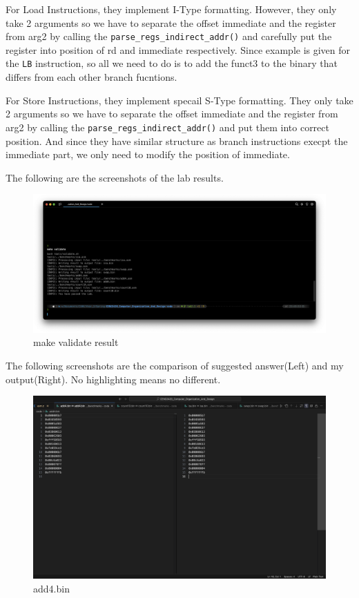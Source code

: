 \documentclass[12pt, a4paper]{article}
\begin{document}
\begin{ans}
For Load Instructions, they implement I-Type formatting. However, they only take 2 arguments so we have to separate the offset immediate and the register 
from arg2 by calling the \texttt{parse\_regs\_indirect\_addr()} and carefully put the register into position of rd and immediate respectively. Since example is given for the 
\texttt{LB} instruction, so all we need to do is to add the funct3 to the binary that differs from each other branch fucntions. 

For Store Instructions, they implement specail S-Type formatting. They only take 2 arguments so we have to separate the offset immediate and the register 
from arg2 by calling the \texttt{parse\_regs\_indirect\_addr()} and put them into correct position. 
And since they have similar structure as branch instructions execpt the immediate part, we only need to modify the position of immediate. 
\end{ans}
\pagebreak
The following are the screenshots of the lab results. 
\begin{figure}[H]
    \caption{make validate result}
    \includegraphics[width=1\linewidth]{../figs/validate.png}
\end{figure}

The following screenshots are the comparison of suggested answer(Left) and my output(Right). No highlighting means no different. 
\begin{figure}[H]
    \caption{add4.bin}
    \includegraphics[width=1\linewidth]{../figs/add4.png}
\end{figure}
\end{document}
